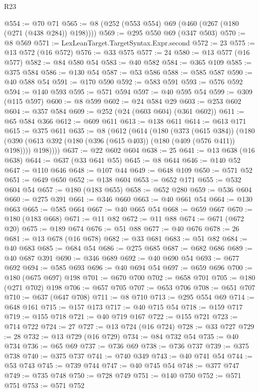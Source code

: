 \begin{lexlean}{R23}
\begin{coremodule}
{{{{{{{{{{{{{{{{{{{{{{{{{{{{{{{{{{{{{{{{{{{{{{{@554 := @70 @71
@565 := @8 (@252 (@553 @554) @69 (@460 (@267 (@180 (@271 (@438 @284)) @198))))
@569 := @295 @550 @69 (@347 @503)
@570 := @8 @569
@571 := LexLeanTarget.TargetSyntax.Expr.second
@572 := 23
@575 := @13 @572 (@16 @572)
@576 := @33 @575
@577 := 24
@580 := @13 @577 (@16 @577)
@582 := @84 @580 @54
@583 := @40 @582
@584 := @365 @109
@585 := @375 @584
@586 := @130 @54
@587 := @53 @586
@588 := @585 @587
@590 := @40 @588 @54
@591 := @170 @590
@592 := @583 @591
@593 := @576 @592
@594 := @140 @593
@595 := @571 @594
@597 := @40 @595 @54
@599 := @309 (@115 @597)
@600 := @8 @599
@602 := @24 @584 @29
@603 := @253 @602
@604 := @357 @584
@609 := @252 (@24 (@603 @604) (@361 @602))
@611 := @65 @584 @366
@612 := @609 @611
@613 := @138 @611
@614 := @613 @171
@615 := @375 @611
@635 := @8
    (@612
      (@614
        (@180
          (@373 (@615 @384))
          (@180 (@390 (@613 @392 (@180 (@396 (@615 @403)) (@180 (@409 (@576 @411)) @198)))) @198))))
@637 := @22 @602 @604
@638 := 25
@641 := @13 @638 (@16 @638)
@644 := @637 (@33 @641 @55)
@645 := @8 @644
@646 := @140 @52
@647 := @110 @646
@648 := @107 @44
@649 := @648 @109
@650 := @571 @52
@651 := @649 @650
@652 := @138 @604
@653 := @652 @171
@655 := @532 @604 @54
@657 := @180 (@183 @655)
@658 := @652 @280
@659 := @536 @604
@660 := @275 @391
@661 := @346 @660
@663 := @40 @661 @54
@664 := @130 @663
@665 := @585 @664
@667 := @40 @665 @54
@668 := @659 @667
@670 := @180 (@183 @668)
@671 := @11 @82
@672 := @11 @88
@674 := @671 (@672 @20)
@675 := @189 @674
@676 := @51 @88
@677 := @40 @676
@678 := 26
@681 := @13 @678 (@16 @678)
@682 := @33 @681
@683 := @51 @82
@684 := @40 @683
@685 := @684 @54
@686 := @275 @685
@687 := @682 @686
@689 := @40 @687 @391
@690 := @346 @689
@692 := @40 @690 @54
@693 := @677 @692
@694 := @585 @693
@696 := @40 @694 @54
@697 := @659 @696
@700 := @180 (@675 @697) @198
@701 := @670 @700
@702 := @658 @701
@705 := @180 (@271 @702) @198
@706 := @657 @705
@707 := @653 @706
@708 := @651 @707
@710 := @637 (@647 @708)
@711 := @8 @710
@713 := @295 @554 @69
@714 := @648 @161
@715 := @157 @173
@717 := @40 @715 @54
@718 := @159 @717
@719 := @155 @718
@721 := @40 @719 @167
@722 := @155 @721
@723 := @714 @722
@724 := 27
@727 := @13 @724 (@16 @724)
@728 := @33 @727
@729 := 28
@732 := @13 @729 (@16 @729)
@734 := @84 @732 @54
@735 := @40 @734
@736 := @65 @69
@737 := @736 @69
@738 := @736 @737
@739 := @375 @738
@740 := @375 @737
@741 := @740 @349
@743 := @40 @741 @54
@744 := @53 @743
@745 := @739 @744
@747 := @40 @745 @54
@748 := @377 @747
@749 := @735 @748
@750 := @728 @749
@751 := @140 @750
@752 := @571 @751
@753 := @571 @752
}}}}}}}}}}}}}}}}}}}}}}}}}}}}}}}}}}}}}}}}}}}}}}}
\end{coremodule}
\end{lexlean}
